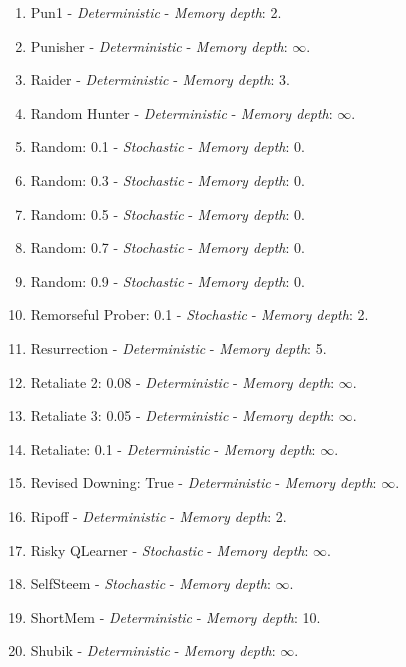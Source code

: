 \documentclass[10pt,letterpaper]{article}
\begin{document}
\begin{enumerate}
\item Pun1 - \textit{Deterministic} - \textit{Memory depth}: 2. \cite{Ashlock2006}
\item Punisher - \textit{Deterministic} - \textit{Memory depth}: \(\infty\). \cite{axelrodproject}
\item Raider - \textit{Deterministic} - \textit{Memory depth}: 3. \cite{Ashlock2014}
\item Random Hunter - \textit{Deterministic} - \textit{Memory depth}: \(\infty\). \cite{axelrodproject}
\item Random: 0.1 - \textit{Stochastic} - \textit{Memory depth}: 0.
\item Random: 0.3 - \textit{Stochastic} - \textit{Memory depth}: 0.
\item Random: 0.5 - \textit{Stochastic} - \textit{Memory depth}: 0. \cite{Axelrod1980, Tzafestas2000}
\item Random: 0.7 - \textit{Stochastic} - \textit{Memory depth}: 0.
\item Random: 0.9 - \textit{Stochastic} - \textit{Memory depth}: 0.
\item Remorseful Prober: 0.1 - \textit{Stochastic} - \textit{Memory depth}: 2. \cite{Li2011}
\item Resurrection - \textit{Deterministic} - \textit{Memory depth}: 5. \cite{Eckhart2015}
\item Retaliate 2: 0.08 - \textit{Deterministic} - \textit{Memory depth}: \(\infty\). \cite{axelrodproject}
\item Retaliate 3: 0.05 - \textit{Deterministic} - \textit{Memory depth}: \(\infty\). \cite{axelrodproject}
\item Retaliate: 0.1 - \textit{Deterministic} - \textit{Memory depth}: \(\infty\). \cite{axelrodproject}
\item Revised Downing: True - \textit{Deterministic} - \textit{Memory depth}: \(\infty\). \cite{Axelrod1980}
\item Ripoff - \textit{Deterministic} - \textit{Memory depth}: 2. \cite{Ashlock2008}
\item Risky QLearner - \textit{Stochastic} - \textit{Memory depth}: \(\infty\). \cite{axelrodproject}
\item SelfSteem - \textit{Stochastic} - \textit{Memory depth}: \(\infty\). \cite{Andre2013}
\item ShortMem - \textit{Deterministic} - \textit{Memory depth}: 10. \cite{Andre2013}
\item Shubik - \textit{Deterministic} - \textit{Memory depth}: \(\infty\). \cite{Axelrod1980}

\end{enumerate}
\end{document}
